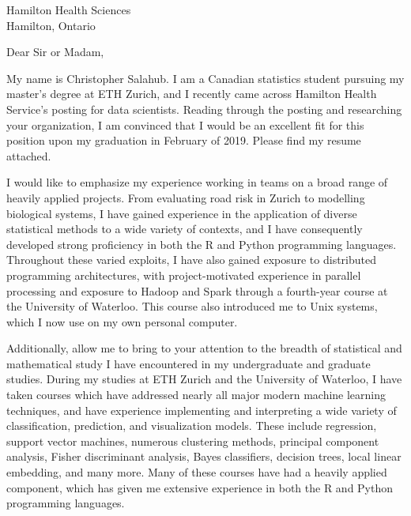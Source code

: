 \documentclass[11pt,a4paper,sans]{letter}
\begin{document}
	\begin{letter}{Hamilton Health Sciences \\ Hamilton, Ontario}

		\opening{Dear Sir or Madam,}
		
		My name is Christopher Salahub. I am a Canadian statistics student pursuing my master’s degree at ETH Zurich, and I recently came across Hamilton Health Service's posting for data scientists. Reading through the posting and researching your organization, I am convinced that I would be an excellent fit for this position upon my graduation in February of 2019. Please find my resume attached.
		
		\begin{comment}Starmind aims to remove the "e-mail lottery" expertise method from large organization, so I would like to begin by emphasizing my experience working with text data. For my publication, \href{https://rss.onlinelibrary.wiley.com/doi/full/10.1111/j.1740-9713.2018.01148.x}{\textit{About ``her emails''}}, I used regular expressions and other tools to extract, parse, filter, and analyse a corpus of almost 33,000 emails, before finally displaying these in an \href{https://shiny.math.uwaterloo.ca/sas/clinton/}{interactive web application}. This entire project was executed in R, and has made me adept at identifying and explaining errors and inconsistencies in real-world text data, experience which I believe would be a great asset to your company.
		\end{comment}
		
		I would like to emphasize my experience working in teams on a broad range of heavily applied projects. From evaluating road risk in Zurich to modelling biological systems, I have gained experience in the application of diverse statistical methods to a wide variety of contexts, and I have consequently developed strong proficiency in both the R and Python programming languages. Throughout these varied exploits, I have also gained exposure to distributed programming architectures, with project-motivated experience in parallel processing and exposure to Hadoop and Spark through a fourth-year course at the University of Waterloo. This course also introduced me to Unix systems, which I now use on my own personal computer.
		
		Additionally, allow me to bring to your attention to the breadth of statistical and mathematical study I have encountered in my undergraduate and graduate studies. During my studies at ETH Zurich and the University of Waterloo, I have taken courses which have addressed nearly all major modern machine learning techniques, and have experience implementing and interpreting a wide variety of classification, prediction, and visualization models. These include regression, support vector machines, numerous clustering methods, principal component analysis, Fisher discriminant analysis, Bayes classifiers, decision trees, local linear embedding, and many more. Many of these courses have had a heavily applied component, which has given me extensive experience in both the R and Python programming languages.
		

\end{letter}
\end{document}
